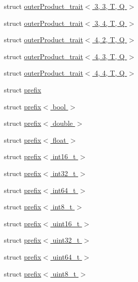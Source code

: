 \begin{DoxyCompactItemize}
\item 
struct \hyperlink{structglm_1_1detail_1_1outer_product__trait_3_013_00_013_00_01_t_00_01_q_01_4}{outer\+Product\+\_\+trait$<$ 3, 3, T, Q $>$}
\item 
struct \hyperlink{structglm_1_1detail_1_1outer_product__trait_3_013_00_014_00_01_t_00_01_q_01_4}{outer\+Product\+\_\+trait$<$ 3, 4, T, Q $>$}
\item 
struct \hyperlink{structglm_1_1detail_1_1outer_product__trait_3_014_00_012_00_01_t_00_01_q_01_4}{outer\+Product\+\_\+trait$<$ 4, 2, T, Q $>$}
\item 
struct \hyperlink{structglm_1_1detail_1_1outer_product__trait_3_014_00_013_00_01_t_00_01_q_01_4}{outer\+Product\+\_\+trait$<$ 4, 3, T, Q $>$}
\item 
struct \hyperlink{structglm_1_1detail_1_1outer_product__trait_3_014_00_014_00_01_t_00_01_q_01_4}{outer\+Product\+\_\+trait$<$ 4, 4, T, Q $>$}
\item 
struct \hyperlink{structglm_1_1detail_1_1prefix}{prefix}
\item 
struct \hyperlink{structglm_1_1detail_1_1prefix_3_01bool_01_4}{prefix$<$ bool $>$}
\item 
struct \hyperlink{structglm_1_1detail_1_1prefix_3_01double_01_4}{prefix$<$ double $>$}
\item 
struct \hyperlink{structglm_1_1detail_1_1prefix_3_01float_01_4}{prefix$<$ float $>$}
\item 
struct \hyperlink{structglm_1_1detail_1_1prefix_3_01int16__t_01_4}{prefix$<$ int16\+\_\+t $>$}
\item 
struct \hyperlink{structglm_1_1detail_1_1prefix_3_01int32__t_01_4}{prefix$<$ int32\+\_\+t $>$}
\item 
struct \hyperlink{structglm_1_1detail_1_1prefix_3_01int64__t_01_4}{prefix$<$ int64\+\_\+t $>$}
\item 
struct \hyperlink{structglm_1_1detail_1_1prefix_3_01int8__t_01_4}{prefix$<$ int8\+\_\+t $>$}
\item 
struct \hyperlink{structglm_1_1detail_1_1prefix_3_01uint16__t_01_4}{prefix$<$ uint16\+\_\+t $>$}
\item 
struct \hyperlink{structglm_1_1detail_1_1prefix_3_01uint32__t_01_4}{prefix$<$ uint32\+\_\+t $>$}
\item 
struct \hyperlink{structglm_1_1detail_1_1prefix_3_01uint64__t_01_4}{prefix$<$ uint64\+\_\+t $>$}
\item 
struct \hyperlink{structglm_1_1detail_1_1prefix_3_01uint8__t_01_4}{prefix$<$ uint8\+\_\+t $>$}
\item 

\end{DoxyCompactItemize}
